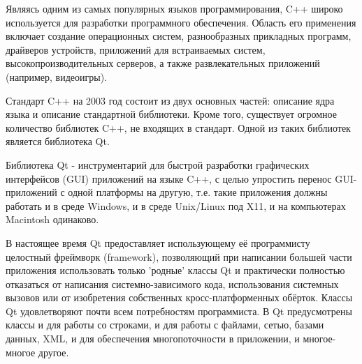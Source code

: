 \documentclass[12pt,a4paper,oneside]{article} %
\begin{document}
Являясь одним из самых популярных языков программирования, \linebreak
C++ широко используется для разработки программного обеспечения. \linebreak
Область его применения включает создание операционных систем, \linebreak
разнообразных прикладных программ, драйверов устройств, приложений \linebreak
для встраиваемых систем, высокопроизводительных серверов, а также \linebreak
развлекательных приложений (например, видеоигры).

Стандарт C++ на 2003 год состоит из двух основных частей: описание \linebreak
ядра языка и описание стандартной библиотеки. Кроме того, существует \linebreak
огромное количество библиотек C++, не входящих в стандарт. \linebreak
Одной из таких библиотек является библиотека Qt.

Библиотека Qt - инструментарий для быстрой разработки графических \linebreak
интерфейсов (GUI) приложений на языке C++, с целью упростить \linebreak
перенос GUI-приложений с одной платформы на другую, т.е. такие \linebreak
приложения должны работать и в среде Windows, и в среде Unix/Linux \linebreak
под X11, и на компьютерах Macintosh одинаково.

В настоящее время Qt предоставляет использующему её программисту \linebreak
целостный фреймворк (framework), позволяющий при написании \linebreak
большей части приложения использовать только 'родные' классы Qt \linebreak
и практически полностью отказаться от написания системно-зависимого \linebreak
кода, использования системных вызовов или от изобретения \linebreak
собственных кросс-платформенных обёрток. Классы Qt удовлетворяют \linebreak
почти всем потребностям программиста. В Qt предусмотрены классы и \linebreak
для работы со строками, и для работы с файлами, сетью, базами \linebreak
данных, XML, и для обеспечения многопоточности в приложении, и \linebreak
многое-многое другое.
\end{document}
